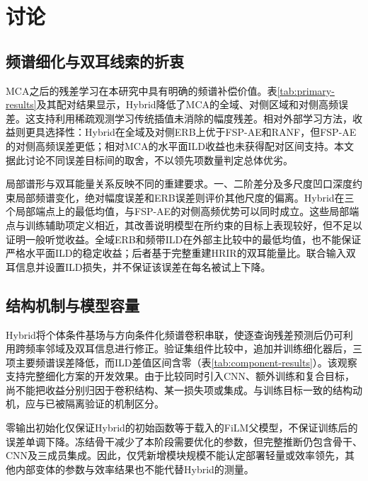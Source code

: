 \section{讨论}
\label{sec:discussion}

\subsection{频谱细化与双耳线索的折衷}
MCA之后的残差学习在本研究中具有明确的频谱补偿价值。表\ref{tab:primary-results}及其配对结果显示，Hybrid降低了MCA的全域、对侧区域和对侧高频误差。这支持利用稀疏观测学习传统插值未消除的幅度残差。相对外部学习方法，收益则更具选择性：Hybrid在全域及对侧ERB上优于FSP-AE和RANF，但FSP-AE的对侧高频误差更低；相对MCA的水平面ILD收益也未获得配对区间支持。本文据此讨论不同误差目标间的取舍，不以领先项数量判定总体优劣。

局部谱形与双耳能量关系反映不同的重建要求。一、二阶差分及多尺度凹口深度约束局部频谱变化，绝对幅度误差和ERB误差则评价其他尺度的偏离。Hybrid在三个局部端点上的最低均值，与FSP-AE的对侧高频优势可以同时成立。这些局部端点与训练辅助项定义相近，其改善说明模型在所约束的目标上表现较好，但不足以证明一般听觉收益。全域ERB和频带ILD在外部主比较中的最低均值，也不能保证严格水平面ILD的稳定收益；后者基于完整重建HRIR的双耳能量比。联合输入双耳信息并设置ILD损失，并不保证该误差在每名被试上下降。

\subsection{结构机制与模型容量}
Hybrid将个体条件基场与方向条件化频谱卷积串联，使逐查询残差预测后仍可利用跨频率邻域及双耳信息进行修正。验证集组件比较中，追加并训练细化器后，三项主要频谱误差降低，而ILD差值区间含零（表\ref{tab:component-results}）。该观察支持完整细化方案的开发效果。由于比较同时引入CNN、额外训练和复合目标，尚不能把收益分别归因于卷积结构、某一损失项或集成。与训练目标一致的结构动机，应与已被隔离验证的机制区分。

零输出初始化仅保证Hybrid的初始函数等于载入的FiLM父模型，不保证训练后的误差单调下降。冻结骨干减少了本阶段需要优化的参数，但完整推断仍包含骨干、CNN及三成员集成。因此，仅凭新增模块规模不能认定部署轻量或效率领先，其他内部变体的参数与效率结果也不能代替Hybrid的测量。

